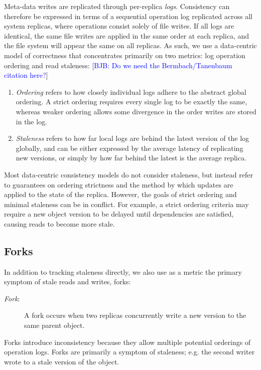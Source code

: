 \documentclass[10pt,conference,letterpaper]{IEEEtran}
\newcommand{\blue}[1]{{\textcolor{blue}{#1}}}
\newcommand{\bjb}[1]{[\blue{BJB: #1}]}
\begin{document}
Meta-data writes are replicated through per-replica \emph{logs}.
Consistency can therefore be expressed in terms of a sequential operation log replicated across all
system replicas, where operations consist solely of file writes.
If all logs are identical, the same file writes are applied in the same
order at each replica, and the file system will appear the same on all replicas.
As such, we use a {data-centric} model of
correctness that concentrates primarily on two metrics: log operation ordering and
read staleness: \bjb{Do we need the Bermbach/Tanenbaum citation here?}
\begin{enumerate}
\item \emph{Ordering} refers to how closely individual logs adhere to the abstract
  global ordering. A strict ordering requires every single log to be exactly the
  same, whereas weaker ordering allows some divergence in the order writes are stored in
  the log.
\item \emph{Staleness} refers to how far local logs are behind the latest version of the log globally,
  and can be either expressed by the average latency of replicating new versions, or
  simply by how far behind the latest is the average replica.
\end{enumerate}

Most data-centric consistency models do not consider staleness, but instead refer to
guarantees on ordering strictness and the method by which updates are applied to the state
of the replica.
However, the goals of strict ordering and minimal staleness can be in conflict. For
example, a strict ordering criteria may require a new object version to be delayed until
dependencies are satisfied, causing reads to become more stale.

\subsection{Forks}

In addition to tracking staleness directly, we also use as a metric the primary symptom of stale
reads and writes, forks:
\begin{description}
    \item[\textit{Fork}:] A fork occurs when two replicas concurrently write a new version to the same parent object.
\end{description}
Forks introduce inconsistency because they allow multiple potential orderings of operation
logs.
Forks are primarily a symptom of staleness; e.g. the second writer wrote to
a stale version of the object.
\end{document}
